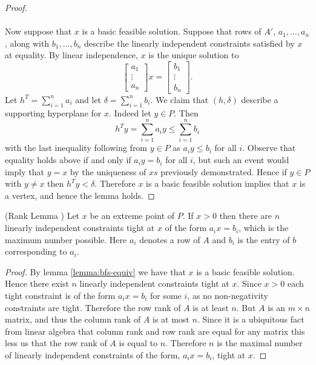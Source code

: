 \begin{proof}
\paragraph{}
Now suppose that $x$ is a basic feasible solution. Suppose that rows of $A'$, $a_1, \dots, a_n$, along with $b_1, \dots, b_n$ describe the linearly independent constraints satisfied by $x$ at equality. By linear independence, $x$ is the unique solution to 
$$\begin{bmatrix} a_1 \\ \vdots \\ a_n \end{bmatrix} x = \begin{bmatrix} b_1 \\ \vdots \\ b_n \end{bmatrix}.$$
Let $h^T = \sum_{i=1}^n a_i$ and let $\delta = \sum_{i=1}^n b_i$. We claim that $(h, \delta)$ describe a supporting hyperplane for $x$. Indeed let $y \in P$. Then 
$$ h^T y = \sum_{i=1}^n a_i y \leq \sum_{i=1}^n b_i$$
with the last inequality following from $y \in P$ as $a_i y \leq b_i$ for all $i$. Observe that equality holds above if and only if $a_i y = b_i$ for all $i$, but such an event would imply that $y = x$ by the uniqueness of $xs$ previously demonstrated. Hence if $y \in P$ with $y \neq x$ then $h^T y < \delta$. Therefore $x$ is a basic feasible solution implies that $x$ is a vertex, and hence the lemma holds. 
\end{proof}
\begin{lemma}\label{lemma:rank}
(Rank Lemma \cite{lau2011iterative}) Let $x$ be an extreme point of $P$. If $x>0$ then there are $n$ linearly independent constraints tight at $x$ of the form $a_ix = b_i$, which is the maximum number possible. Here $a_i$ denotes a row of $A$ and $b_i$ is the entry of $b$ corresponding to $a_i$.  
\end{lemma}
\begin{proof}
By lemma \ref{lemma:bfs-equiv} we have that $x$ is a basic feasible solution. Hence there exist $n$ linearly independent constraints tight at $x$. Since $x>0$ each tight constraint is of the form $a_i x = b_i$ for some $i$, as no non-negativity constraints are tight. Therefore the row rank of $A$ is at least $n$. But $A$ is an $m \times n$ matrix, and thus the column rank of $A$ is at most $n$. Since it is a ubiquitous fact from linear algebra that column rank and row rank are equal for any matrix this less us that the row rank of $A$ is equal to $n$. Therefore $n$ is the maximal number of linearly independent constraints of the form, $a_i x = b_i$, tight at $x$.
\end{proof}
